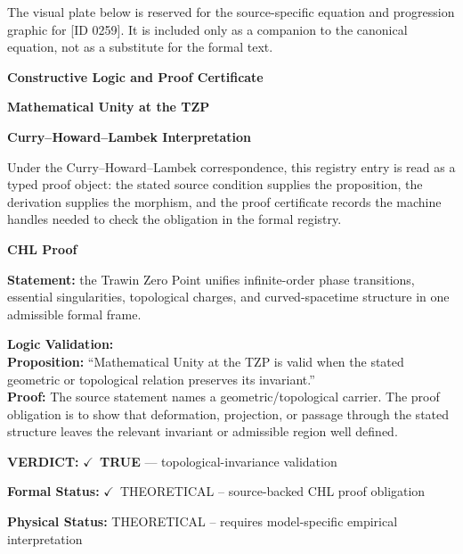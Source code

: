 \begingroup\footnotesize\sloppy
The visual plate below is reserved for the source-specific equation and progression graphic for [ID 0259]. It is included only as a companion to the canonical equation, not as a substitute for the formal text.
\par\endgroup
\ifTZPDarkEdition
{}
\fi

\clearpage
\begingroup\tzpsupportsetup
\noindent\textbf{\fontsize{10.8pt}{12.8pt}\selectfont [ID 0259] Constructive Logic and Proof Certificate}\par
\noindent\textbf{\fontsize{10pt}{12pt}\selectfont Mathematical Unity at the TZP}\par
\vspace{0.45em}
\begingroup
\footnotesize
\setlength{\parskip}{0.22em}
\setlength{\parindent}{0pt}
\noindent\textbf{Curry--Howard--Lambek Interpretation}\par
Under the Curry--Howard--Lambek correspondence, this registry entry is read as a typed proof
object: the stated source condition supplies the proposition, the derivation supplies the
morphism, and the proof certificate records the machine handles needed to check the obligation
in the formal registry.

\vspace{0.45em}
\noindent\textbf{CHL Proof}\par
\textbf{Statement:} the Trawin Zero Point unifies infinite-order phase transitions, essential singularities, topological charges, and curved-spacetime structure in one admissible formal frame.

\textbf{Logic Validation:}\\
\textbf{Proposition:} ``Mathematical Unity at the TZP is valid when the stated geometric or topological relation
preserves its invariant.''\\
\textbf{Proof:} The source statement names a geometric/topological carrier. The proof obligation is to
show that deformation, projection, or passage through the stated structure leaves the
relevant invariant or admissible region well defined.

\textbf{VERDICT:} \ensuremath{\checkmark}\ \textbf{TRUE} --- topological-invariance validation

\textbf{Formal Status:} \ensuremath{\checkmark}\ THEORETICAL -- source-backed CHL proof obligation

\textbf{Physical Status:} THEORETICAL -- requires model-specific empirical interpretation
\par\vspace{0.45em}
\par
\ifTZPDarkEdition
{}
\fi
\endgroup
\endgroup
